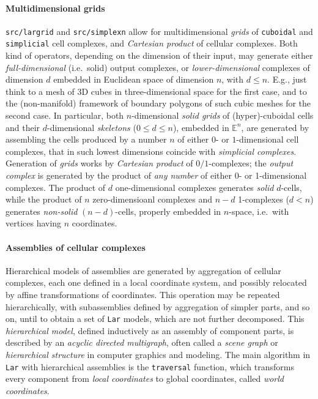 \documentclass{juliacon}
\def\E{\mathbb{E}}
\begin{document}
\paragraph*{Multidimensional grids}
\texttt{src/largrid} and \texttt{src/simplexn} allow for multidimensional \emph{grids} of
\texttt{cuboidal} and \texttt{simplicial} cell complexes, and  \emph{Cartesian product} of cellular complexes. Both kind of
operators, depending on the dimension of their input, may generate
either \emph{full-dimensional} (i.e.~solid) output complexes, or
\emph{lower-dimensional} complexes of dimension $d$ embedded in
Euclidean space of dimension $n$, with
$d\leq n$. E.g., just think to a mesh of 3D cubes in three-dimensional space for
the first case, and to the (non-manifold) framework of boundary polygons
of such cubic meshes for the second case. In particular, both
$n$-dimensional \emph{solid grids} of (hyper)-cuboidal cells
and their $d$-dimensional \emph{skeletons}
($0\leq d\leq n$), embedded in
$\E^n$, are generated by assembling the cells produced by a
number $n$ of either $0$- or $1$-dimensional cell
complexes, that in such lowest dimensions coincide with \emph{simplicial
complexes}. Generation of \emph{grids} works by \emph{Cartesian product} of
$0/1$-complexes; the \emph{output complex} is generated by the product of
\emph{any number} of either 0- or 1-dimensional complexes. The
product of $d$ one-dimensional complexes generates \emph{solid}
$d$-cells, while the product of $n$ zero-dimensioanl complexes and
$n-d$ 1-complexes ($d < n$) generates
\emph{non-solid} $(n-d)$-cells, properly embedded in
$n$-space, i.e.~with vertices having $n$ coordinates.


\paragraph*{Assemblies of cellular complexes}
Hierarchical models of assemblies are generated by aggregation
of cellular complexes, each one defined in a local coordinate system,
and possibly relocated by affine transformations of coordinates. This
operation may be repeated hierarchically, with subassemblies defined by
aggregation of simpler parts, and so on, until to obtain a set of \texttt{Lar}
models, which are not further decomposed.
This \emph{hierarchical model}, defined inductively
as an assembly of component parts, is described by an \emph{acyclic
directed multigraph}, often called a \emph{scene graph} or
\emph{hierarchical structure} in computer graphics and modeling. The
main algorithm in \texttt{Lar} with hierarchical assemblies is the \texttt{traversal}
function, which transforms every component from \emph{local coordinates}
to global coordinates, called \emph{world coordinates}.
\end{document}
